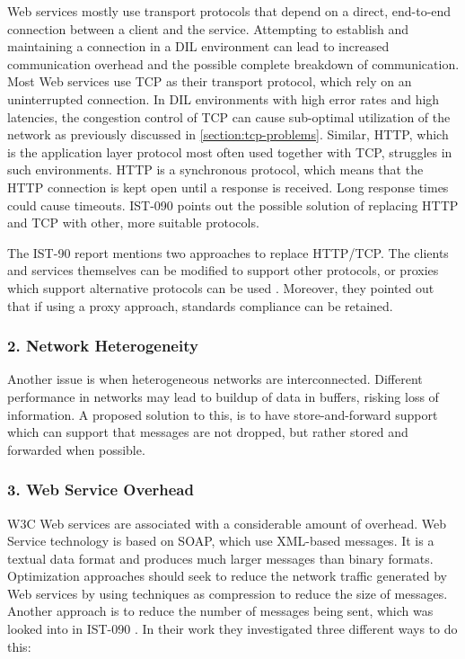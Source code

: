 Web services mostly use transport protocols that depend on a direct, end-to-end
connection between a client and the service. Attempting to establish and
maintaining a connection in a DIL environment can lead to increased communication
overhead and the possible complete breakdown of communication. Most Web services use
TCP as their transport protocol, which rely on an uninterrupted connection.
In DIL environments with high error rates and high latencies,
the congestion control of TCP can cause sub-optimal utilization of the network
as previously discussed in \cref{section:tcp-problems}. Similar, HTTP, which is
the application layer protocol most often used together with TCP, struggles in
such environments. HTTP is a synchronous protocol, which means that the HTTP
connection is kept open until a response is received. Long response times could cause
timeouts. IST-090 points out the possible solution of replacing HTTP and TCP with
other, more suitable protocols.

The IST-90 report mentions two approaches to replace HTTP/TCP. The clients and
services themselves can be modified to support other protocols, or proxies
which support alternative protocols can be used \cite{ist-090}. Moreover, they
pointed out that if using a proxy approach, standards compliance can be
retained.


\subsubsection{2. Network Heterogeneity}

Another issue is when heterogeneous networks are interconnected. Different
performance in networks may lead to buildup of data in buffers, risking loss of
information. A proposed solution to this, is to have store-and-forward support
which can support that messages are not dropped, but rather stored and forwarded when
possible.


\subsubsection{3. Web Service Overhead}

W3C Web services are associated with a considerable amount of overhead. Web
Service technology is based on SOAP, which use XML-based messages. It is a
textual data format and produces much larger messages than binary formats.
Optimization approaches should seek to reduce the network traffic generated by
Web services by using techniques as compression to reduce the size of messages.
Another approach is to reduce the number of messages being sent, which was
looked into in IST-090 \cite{ist-090}. In their work they investigated three
different ways to do this:


